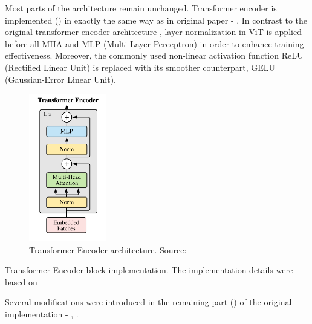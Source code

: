 Most parts of the architecture remain unchanged.
Transformer encoder is implemented () in exactly the same way as in original paper - .
In contrast to the original transformer encoder architecture \cite{Vaswani2017}, layer normalization in ViT is applied before all MHA and MLP (Multi Layer Perceptron) in order to enhance training effectiveness.
Moreover, the commonly used non-linear activation function ReLU (Rectified Linear Unit) is replaced with its smoother counterpart, GELU (Gaussian-Error Linear Unit).

\begin{figure}[H] 
  \centering     
  \includegraphics[width=0.3\textwidth]{img/transformer-encoder.png} 
  \caption{Transformer Encoder architecture. Source: \cite{vitPaper}}
  \label{fig:transformer-encoder}
\end{figure}

\newenvironment{longlistingA}{\captionsetup{type=listing, width=0.8\textwidth}}{}
\begin{longlistingA}
    \caption{Transformer Encoder block implementation. The implementation details were based on \cite{d2lViT}}
    \label{lst:transformer_encoder}
\end{longlistingA}
\vspace{12pt}

Several modifications were introduced in the remaining part () of the original implementation - , .

